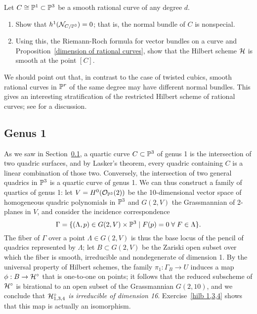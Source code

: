 \begin{exercise}
Let $C \cong \PP^1 \subset \PP^3$ be a smooth rational curve of any degree $d$. 
\begin{enumerate}
\item Show that $h^1(\cN_{C/\PP^3}) = 0$; that is, the normal bundle of $C$ is nonspecial.
\item Using this, the Riemann-Roch formula for vector bundles on a curve and Proposition~\ref{dimension of rational curves}, show that the Hilbert scheme $\cH$ is smooth at the point $[C]$.
\end{enumerate} 
\end{exercise}

We should point out that, in contrast to the case of twisted cubics, smooth rational curves in $\PP^r$ of the same degree may have different normal bundles. This gives an interesting stratification of the restricted Hilbert scheme of rational curves; see \cite{RiedlPaper?} for a discussion.

\subsection{Genus 1}
 As we saw in Section~\ref{}, a quartic curve $C \subset \PP^3$ of genus 1 is the intersection of two quadric surfaces, and by Lasker's theorem, every quadric containing $C$ is a linear combination of those two. Conversely, the intersection of two general quadrics in $\PP^3$ is a quartic curve of genus 1. We can thus construct a family of quartics of genus 1: let $V = H^0(\cO_{\PP^3}(2))$ be the 10-dimensional vector space of homogeneous quadric polynomials in $\PP^3$ and $G(2,V)$ the Grassmannian of 2-planes in $V$, and consider the incidence correspondence
$$
\Gamma = \{ (\Lambda, p) \in G(2,V) \times \PP^3 \mid F(p)=0 \; \forall \; F \in \Lambda \}.
$$
The fiber of $\Gamma$ over a point $\Lambda \in G(2,V)$ is thus the base locus of the pencil of quadrics represented by $\Lambda$; let $B \subset G(2,V)$ be the Zariski open subset over which the fiber is smooth, irreducible and nondegenerate of dimension 1. By the universal property of Hilbert schemes, the family $\pi_1 : \Gamma_B \to U$ induces a map $\phi : B \to \cH^\circ$ that is one-to-one on points; it follows that the reduced subscheme of $\cH^\circ$ is birational to an open subset of the Grassmannian $G(2,10)$, and we conclude that \emph{$\cH^\circ_{1,3,4}$ is irreducible of dimension 16}. Exercise~\ref{hilb 1,3,4} shows that this map is actually an isomorphism.

